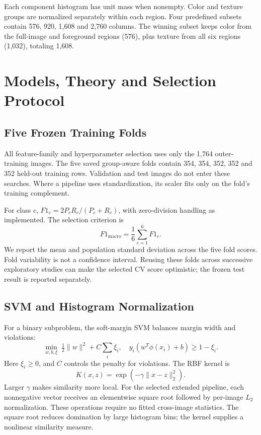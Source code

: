 \documentclass[conference]{IEEEtran}
\begin{document}
Each component histogram has unit mass when nonempty. Color and texture groups are normalized separately within each region. Four predefined subsets contain 576, 920, 1,608 and 2,760 columns. The winning subset keeps color from the full-image and foreground regions (576), plus texture from all six regions (1,032), totaling 1,608.

\section{Models, Theory and Selection Protocol}
\subsection{Five Frozen Training Folds}
All feature-family and hyperparameter selection uses only the 1,764 outer-training images. The five saved group-aware folds contain 354, 354, 352, 352 and 352 held-out training rows. Validation and test images do not enter these searches. Where a pipeline uses standardization, its scaler fits only on the fold's training complement.

For class $c$, $F1_c=2P_cR_c/(P_c+R_c)$, with zero-division handling as implemented. The selection criterion is
\begin{equation}
 F1_{\mathrm{macro}}=\frac{1}{6}\sum_{c=1}^{6} F1_c.
\end{equation}
We report the mean and population standard deviation across the five fold scores. Fold variability is not a confidence interval. Reusing these folds across successive exploratory studies can make the selected CV score optimistic; the frozen test result is reported separately.

\subsection{SVM and Histogram Normalization}
For a binary subproblem, the soft-margin SVM balances margin width and violations:
\begin{equation}
\min_{w,b,\xi}\;\tfrac12\lVert w\rVert^2+C\sum_i\xi_i,
\quad y_i(w^T\phi(x_i)+b)\geq1-\xi_i.
\end{equation}
Here $\xi_i\geq0$, and $C$ controls the penalty for violations. The RBF kernel is
\begin{equation}
K(x,z)=\exp(-\gamma\lVert x-z\rVert_2^2).
\end{equation}
Larger $\gamma$ makes similarity more local. For the selected extended pipeline, each nonnegative vector receives an elementwise square root followed by per-image $L_2$ normalization. These operations require no fitted cross-image statistics. The square root reduces domination by large histogram bins; the kernel supplies a nonlinear similarity measure.
\end{document}
